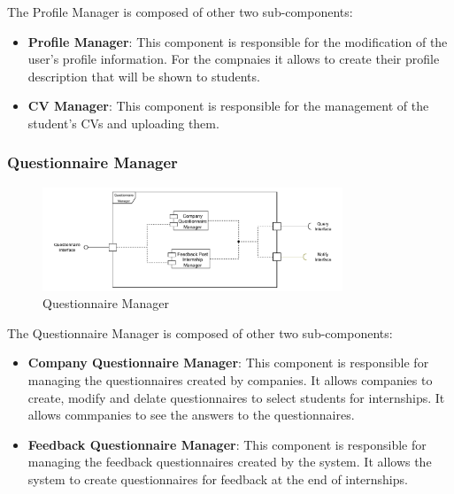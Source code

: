 \par The Profile Manager is composed of other two sub-components:
\begin{itemize}
      \item \textbf{Profile Manager}: This component is responsible for the modification of the user's profile information.
            For the compnaies it allows to create their profile description that will be shown to students.
      \item \textbf{CV Manager}: This component is responsible for the management of the student's CVs and uploading them.
\end{itemize}

\subsubsection{Questionnaire Manager}
\label{subsub:questionnaire-manager}

\begin{figure}[H]
      \centering
      \includegraphics[width=0.8\textwidth]{Images/Questionnaire_Architecture.pdf}
      \caption{Questionnaire Manager}
      \label{questionnaire-manager-arch}
\end{figure}

\par The Questionnaire Manager is composed of other two sub-components:
\begin{itemize}
      \item \textbf{Company Questionnaire Manager}: This component is responsible for managing the questionnaires created by companies.
            It allows companies to create, modify and delate questionnaires to select students for internships.
            It allows commpanies to see the answers to the questionnaires.
      \item \textbf{Feedback Questionnaire Manager}: This component is responsible for managing the feedback questionnaires created by the system.
            It allows the system to create questionnaires for feedback at the end of internships.
\end{itemize}

